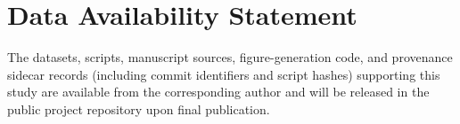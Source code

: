 \documentclass[sensors,article,submit,moreauthors,pdftex]{Definitions/mdpi}
\begin{document}
\section*{Data Availability Statement}
The datasets, scripts, manuscript sources, figure-generation code, and provenance sidecar records (including commit identifiers and script hashes) supporting this study are available from the corresponding author and will be released in the public project repository upon final publication.


\end{document}
